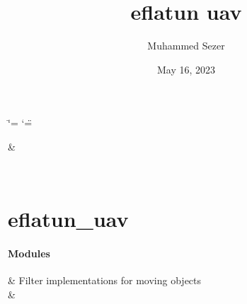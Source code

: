 \documentclass[letterpaper,10pt,english]{sphinxmanual}
\title{eflatun uav}
\date{May 16, 2023}
\author{Muhammed Sezer}
\begin{document}
\ifdefined\shorthandoff
  \ifnum\catcode`\=\string=\active\shorthandoff{=}\fi
  \ifnum\catcode`\"=\active{}\fi
\fi

\pagestyle{empty}
\sphinxmaketitle
\pagestyle{plain}
\sphinxtableofcontents
\pagestyle{normal}
\label{\detokenize{index::doc}}


\sphinxstepscope


\begin{savenotes}\sphinxattablestart
\sphinxthistablewithglobalstyle
\sphinxthistablewithnovlinesstyle
\centering
\begin{tabulary}{\linewidth}[t]{}
\sphinxtoprule
\sphinxtableatstartofbodyhook
\sphinxAtStartPar
{\hyperref[\detokenize{generated/eflatun_uav:module-eflatun_uav}]{}}
&
\sphinxAtStartPar

\\
\sphinxbottomrule
\end{tabulary}
\sphinxtableafterendhook\par
\sphinxattableend\end{savenotes}

\sphinxstepscope


\chapter{eflatun\_uav}
\label{\detokenize{generated/eflatun_uav:module-eflatun_uav}}\label{\detokenize{generated/eflatun_uav:eflatun-uav}}\label{\detokenize{generated/eflatun_uav::doc}}\label{\detokenize{generated/eflatun_uav::doc}}\subsubsection*{Modules}


\begin{savenotes}\sphinxattablestart
\sphinxthistablewithglobalstyle
\sphinxthistablewithnovlinesstyle
\centering
\begin{tabulary}{\linewidth}[t]{}
\sphinxtoprule
\sphinxtableatstartofbodyhook
\sphinxAtStartPar
{\hyperref[\detokenize{generated/eflatun_uav.filters:module-eflatun_uav.filters}]{}}
&
\sphinxAtStartPar
Filter implementations for moving objects
\\
\sphinxhline
\sphinxAtStartPar
{\hyperref[\detokenize{generated/eflatun_uav.helpers:module-eflatun_uav.helpers}]{}}
&
\sphinxAtStartPar

\\
\sphinxbottomrule
\end{tabulary}
\sphinxtableafterendhook\par
\sphinxattableend\end{savenotes}
\end{document}
